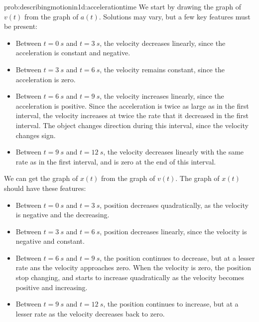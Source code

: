 \newpage
\begin{solution}{prob:describingmotionin1d:accelerationtime}\label{soln:describingmotionin1d:accelerationtime}
We start by drawing the graph of $v(t)$ from the graph of $a(t)$. Solutions may vary, but a few key features must be present:
\begin{itemize}
\item Between $t=\SI{0}{s}$ and $t=\SI{3}{s}$, the velocity decreases linearly, since the acceleration is constant and negative.
\item Between $t=\SI{3}{s}$ and $t=\SI{6}{s}$, the velocity remains constant, since the acceleration is zero.
\item Between $t=\SI{6}{s}$ and $t=\SI{9}{s}$, the velocity increases linearly, since the acceleration is positive. Since the acceleration is twice as large as in the first interval, the velocity increases at twice the rate that it decreased in the first interval. The object changes direction during this interval, since the velocity changes sign.
\item Between $t=\SI{9}{s}$ and $t=\SI{12}{s}$, the velocity decreases linearly with the same rate as in the first interval, and is zero at the end of this interval.
\end{itemize}
We can get the graph of $x(t)$ from the graph of $v(t)$. The graph of $x(t)$ should have these features:
\begin{itemize}
\item Between $t=\SI{0}{s}$ and $t=\SI{3}{s}$, position decreases quadratically, as the velocity is negative and the decreasing.
\item Between $t=\SI{3}{s}$ and $t=\SI{6}{s}$, position decreases linearly, since the velocity is negative and constant.
\item Between $t=\SI{6}{s}$ and $t=\SI{9}{s}$, the position continues to decrease, but at a lesser rate ans the velocity approaches zero. When the velocity is zero, the position stop changing, and starts to increase quadratically as the velocity becomes positive and increasing.
\item Between $t=\SI{9}{s}$ and $t=\SI{12}{s}$, the position continues to increase, but at a lesser rate as the velocity decreases back to zero.
\end{itemize}
\end{solution}


